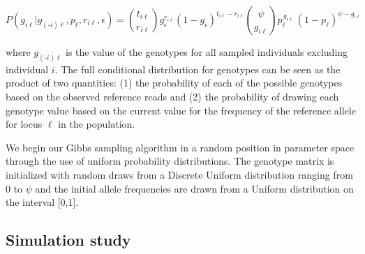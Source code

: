 \documentclass[11pt,english,letterpaper,oneside]{article}
\begin{document}
\begin{equation}\label{G-full}
P(g_{i \ell}|g_{(\text{-}i) \ell},p_{\ell},r_{i \ell},\epsilon) = \binom{t_{i\ell}}{r_{i\ell}} g_\epsilon^{r_{i \ell}}(1-g_\epsilon)^{t_{i \ell}-r_{i \ell}}\displaystyle\binom{\psi}{g_{i \ell}}p_{\ell}^{\,g_{i \ell}}\,(1-p_{\ell})^{\psi-g_{i \ell}}%
\end{equation}

\noindent where $g_{(\text{-}i) \ell}$ is the value of the genotypes for all sampled individuals excluding individual $i$. The full conditional distribution for genotypes can be seen as the product of two quantities: (1) the probability of each of the possible genotypes based on the observed  reference reads and (2) the probability of drawing each genotype value based on the current value for the frequency of the reference allele for locus $\ell$ in the population.


\medskip  

We begin our Gibbs sampling algorithm in a random position in parameter space through the use of uniform probability distributions. The genotype matrix is initialized with random draws from a Discrete Uniform distribution ranging from $0$ to $\psi$ and the initial allele frequencies are drawn from a Uniform distribution on the interval [0,1].

\medskip
\subsection{Simulation study} %
\medskip
\end{document}
